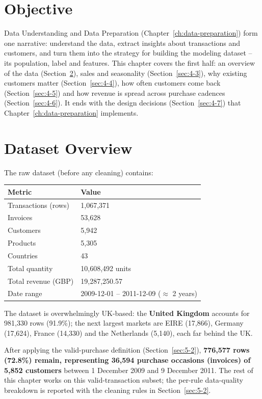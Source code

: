 \section{Objective}
\label{sec:4-1}

Data Understanding and Data Preparation (Chapter~\ref{ch:data-preparation}) form one narrative: understand the data, extract insights about transactions and customers, and turn them into the strategy for building the modeling dataset -- its population, label and features. This chapter covers the first half: an overview of the data (Section~\ref{sec:4-2}), sales and seasonality (Section~\ref{sec:4-3}), why existing customers matter (Section~\ref{sec:4-4}), how often customers come back (Section~\ref{sec:4-5}) and how revenue is spread across purchase cadences (Section~\ref{sec:4-6}). It ends with the design decisions (Section~\ref{sec:4-7}) that Chapter~\ref{ch:data-preparation} implements.

\section{Dataset Overview}
\label{sec:4-2}

The raw dataset (before any cleaning) contains:

\begin{center}
\begin{tabular}{@{}p{5cm}p{8.5cm}@{}}
    \toprule
    Metric & Value \\
    \midrule
    Transactions (rows) & 1,067,371 \\
    Invoices & 53,628 \\
    Customers & 5,942 \\
    Products & 5,305 \\
    Countries & 43 \\
    Total quantity & 10,608,492 units \\
    Total revenue (GBP) & 19,287,250.57 \\
    Date range & 2009-12-01 -- 2011-12-09 ($\approx$ 2 years) \\
    \bottomrule
\end{tabular}
\end{center}

The dataset is overwhelmingly UK-based: the \textbf{United Kingdom} accounts for 981,330 rows (91.9\%); the next largest markets are EIRE (17,866), Germany (17,624), France (14,330) and the Netherlands (5,140), each far behind the UK.

After applying the valid-purchase definition (Section~\ref{sec:5-2}), \textbf{776,577 rows (72.8\%) remain, representing 36,594 purchase occasions (invoices) of 5,852 customers} between 1 December 2009 and 9 December 2011. The rest of this chapter works on this valid-transaction subset; the per-rule data-quality breakdown is reported with the cleaning rules in Section~\ref{sec:5-2}.

